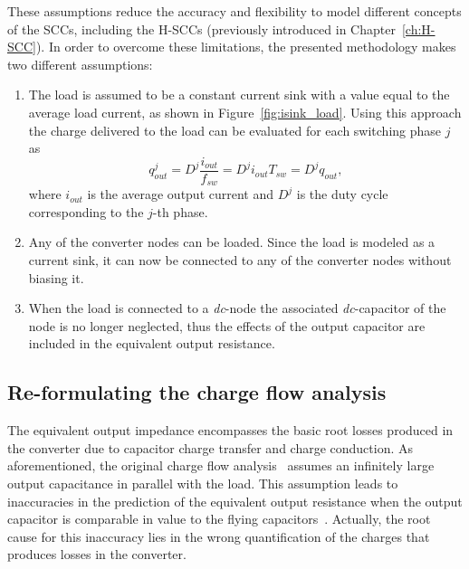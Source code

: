 These assumptions reduce the accuracy and flexibility to model different concepts of the SCCs, including the H-SCCs (previously introduced in Chapter~\ref{ch:H-SCC}). In order to overcome these limitations, the presented methodology makes two different assumptions:
\begin{enumerate}
  \item The load is assumed to be a constant current sink with a value equal to the average load current, as shown in Figure~\ref{fig:isink_load}. Using this approach the charge delivered to the load can be evaluated for each switching phase $j$ as
      \begin{equation}
        q_{out}^j = D^j \frac{i_{out}}{f_{sw}} = D^j i_{out}{T_{sw}}  = D^j q_{out},
      \label{eq:q_out}
      \end{equation}
  where $i_{out}$ is the average output current and $D^j$ is the duty cycle corresponding to the $j$-th phase.


  \item Any of the converter nodes can be loaded. Since the load is modeled as a current sink, it can now be connected to any of the converter nodes without biasing it.

  \item When the load is connected to a \emph{dc}-node the associated \emph{dc}-capacitor of the node is no longer neglected, thus the effects of the output capacitor are included in the equivalent output resistance.

\end{enumerate}

\subsection{Re-formulating the charge flow analysis}
The equivalent output impedance encompasses the basic root losses produced in the converter due to capacitor charge transfer and charge conduction. As aforementioned, the original charge flow analysis~\cite{95Makowski} assumes an infinitely large output capacitance in parallel with the load. This assumption leads to inaccuracies in the prediction of the equivalent output resistance when the output capacitor is comparable in value to the flying capacitors~\cite{2013Breussegem:c_out}. Actually, the root cause for this inaccuracy lies in the wrong quantification of the charges that produces losses in the converter.\\


